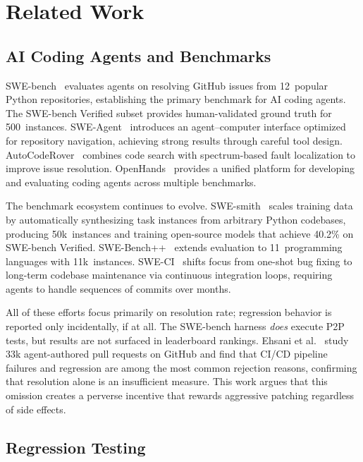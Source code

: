 \documentclass[sigconf,nonacm]{acmart}
\begin{document}
\section{Related Work}
\label{sec:related}

\subsection{AI Coding Agents and Benchmarks}

SWE-bench~\cite{jimenez2024swebench} evaluates agents on resolving GitHub
issues from 12~popular Python repositories, establishing the primary benchmark
for AI coding agents.  The SWE-bench Verified subset provides human-validated
ground truth for 500~instances.  SWE-Agent~\cite{yang2024sweagent} introduces
an agent--computer interface optimized for repository navigation, achieving
strong results through careful tool design.
AutoCodeRover~\cite{zhang2024autocoderover} combines code search with
spectrum-based fault localization to improve issue resolution.
OpenHands~\cite{wang2024openhands} provides a unified platform for developing
and evaluating coding agents across multiple benchmarks.

The benchmark ecosystem continues to evolve.
SWE-smith~\cite{yang2025swesmith} scales training data by automatically
synthesizing task instances from arbitrary Python codebases, producing
50k~instances and training open-source models that achieve 40.2\% on
SWE-bench Verified.
SWE-Bench++~\cite{wang2025swebenchpp} extends evaluation to 11~programming
languages with 11k~instances.
SWE-CI~\cite{chen2026sweci} shifts focus from one-shot bug fixing to
long-term codebase maintenance via continuous integration loops, requiring
agents to handle sequences of commits over months.

All of these efforts focus primarily on resolution rate; regression behavior
is reported only incidentally, if at all.  The SWE-bench harness \emph{does}
execute P2P tests, but results are not surfaced in leaderboard rankings.
Ehsani et al.~\cite{ehsani2026agentfail} study 33k agent-authored pull
requests on GitHub and find that CI/CD pipeline failures and regression
are among the most common rejection reasons, confirming that resolution
alone is an insufficient measure.
This work argues that this omission creates a perverse incentive that rewards
aggressive patching regardless of side effects.

\subsection{Regression Testing}
\end{document}
